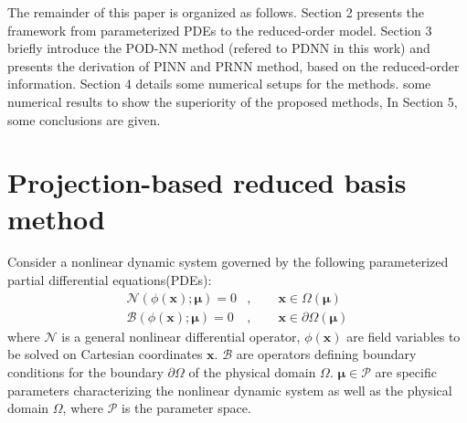 \documentclass[preprint, 10pt]{elsarticle}
\begin{document}
The remainder of this paper is organized as follows. Section 2 presents the framework from parameterized PDEs to the reduced-order model. Section 3 briefly introduce the POD-NN method (refered to PDNN in this work) and presents the derivation of PINN and PRNN method, based on the reduced-order information. Section 4 details some numerical setups for the methods. some numerical results to show the superiority of the proposed methods, In Section 5, some conclusions are given.

\section{Projection-based reduced basis method}\label{sec:POD-G}
Consider a nonlinear dynamic system governed by the following parameterized partial differential equations(PDEs):
\begin{equation}
\begin{aligned}
\mathcal{N}\left(\phi\left(\mathbf{x}\right); \pmb{\mu}\right)=0&,  \qquad \mathbf{x} \in \Omega\left(\pmb{\mu}\right)  \\
\mathcal{B}\left(\phi\left(\mathbf{x}\right); \pmb{\mu}\right)=0&,  \qquad \mathbf{x} \in \partial \Omega\left(\pmb{\mu}\right)
\end{aligned}
\label{eq_GoverningEqs}
\end{equation}
where $\mathcal{N}$ is a general nonlinear differential operator, $\phi\left(\mathbf{x}\right)$ are field variables to be solved on Cartesian coordinates $\mathbf{x}$. $\mathcal{B}$ are operators defining boundary conditions for the boundary $\partial \Omega$ of the physical  domain $\Omega$. $\pmb{\mu} \in \mathcal{P}$ are specific parameters characterizing the nonlinear dynamic system as well as the physical domain $\Omega$, where $\mathcal{P}$ is the parameter space.
\end{document}
